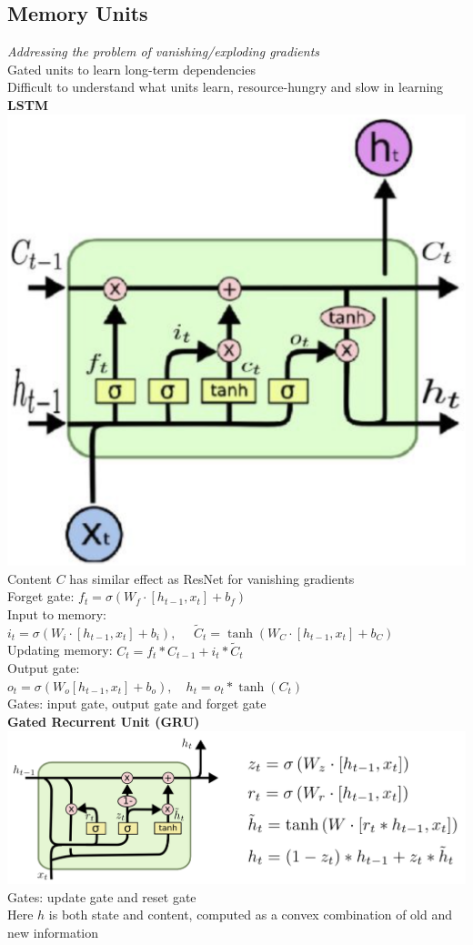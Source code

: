 \subsection*{Memory Units}
\textit{Addressing the problem of vanishing/exploding gradients}\\
Gated units to learn long-term dependencies\\
Difficult to understand what units learn, resource-hungry and slow in learning\\
\textbf{LSTM}\\
\includegraphics[scale=0.17]{lstm_cell.png}
\\Content $C$ has similar effect as ResNet for vanishing gradients\\
Forget gate: $f_t=\sigma(W_f\cdot[h_{t-1},x_t]+b_f)$\\
Input to memory: \\ $i_t=\sigma(W_i\cdot[h_{t-1},x_t]+b_i), \quad $
$\tilde C_t=\tanh (W_C\cdot[h_{t-1},x_t]+b_C)$\\
Updating memory: $C_t=f_t*C_{t-1}+i_t*\tilde C_t$\\
Output gate:\\
$o_t=\sigma(W_o[h_{t-1},x_t]+b_o), \quad h_t=o_t*\tanh (C_t)$\\
Gates: input gate, output gate and forget gate\\
\textbf{Gated Recurrent Unit (GRU)}\\
\includegraphics[scale=0.17]{gru.png}\\
Gates: update gate and reset gate \\
Here $h$ is both state and content, computed as a convex combination of old and new information
